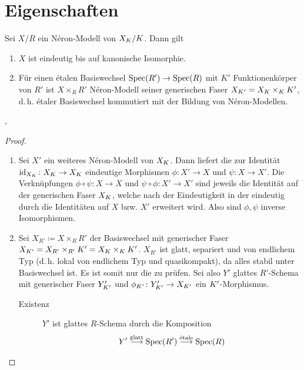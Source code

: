 \documentclass[german]{scrreprt}
\begin{document}

\section{Eigenschaften}
\begin{Satz}
  Sei $X/R$ ein Néron-Modell von $X_{K}/K$. Dann gilt
  \begin{enumerate}[label=(\roman*)]
  \item $X$ ist eindeutig bis auf kanonische Isomorphie.
  \item Für einen étalen Basiswechsel $\operatorname{Spec}(R')\to\operatorname{Spec}(R)$ mit $K'$
    Funktionenkörper von $R'$ ist $X\times_R R'$ Néron-Modell
    seiner generischen Faser $X_{K'}=X_{K}\times_{K}K'$,
    d.\,h. étaler Basiswechsel kommutiert mit der Bildung von
    Néron-Modellen.
  \end{enumerate}
  \cite[1.2, Proposition 2]{neron},
  \cite[vgl.][Proposition IV.5.2]{silverman2}
  \begin{proof}
    \begin{enumerate}[label=(\roman*)]
    \item Sei $X'$ ein weiteres Néron-Modell von $X_{K}$.
      Dann liefert die \NAbbEig zur Identität
      $\mathrm{id}_{X_{K}}\colon X_{K}\to X_{K}$ eindeutige Morphismen
      $\phi\colon X'\to X$ und $\psi\colon X\to X'$.
      Die Verknüpfungen $\phi\circ\psi\colon X\to X$ und
      $\psi\circ\phi\colon X'\to X'$ sind jeweils die Identität auf
      der generischen Faser $X_{K}$, welche nach der Eindeutigkeit in der
      \NAbbEig eindeutig durch die Identitäten auf
      $X$ bzw. $X'$ erweitert wird. Also sind $\phi,\psi$ inverse
      Isomorphismen.
    \item
      Sei $X_{R'}\coloneqq X\times_R R'$ der Basiswechsel
      mit generischer Faser
      $X_{K'}=X_{R'}\times_{R'}K'=X_{K}\times_{K}K'$.
      $X_{R'}$ ist glatt, separiert und von endlichem Typ 
      (d.\,h. lokal von endlichem Typ und quasikompakt), da alles
      stabil unter Basiswechsel ist. Es ist somit nur die
      \NAbbEig zu prüfen.
      Sei also $Y'$ glattes $R'$-Schema mit generischer Faser
      $Y_{K'}'$ und $\phi_{K'}\colon Y_{K'}'\to X_{K'}$ ein
      $K'$-Morphismus. 
      \begin{description}
      \item[Existenz] 
        $Y'$ ist glattes $R$-Schema durch die Komposition
        \begin{gather*}
          Y'\overset{\text{glatt}}\longto\Spec(R')
          \overset{\text{étale}}\longto\Spec(R)

\end{gather*}
\end{description}
\end{enumerate}
\end{proof}
\end{Satz}
\end{document}
